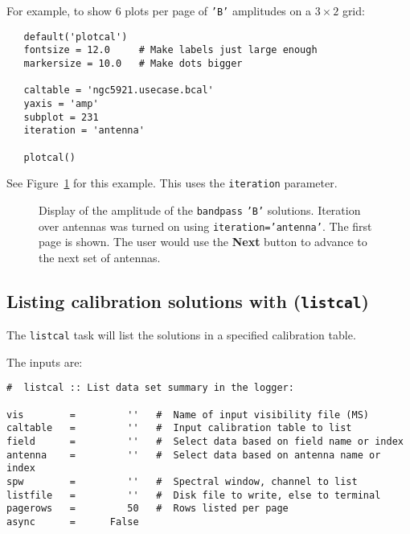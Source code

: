 
For example, to show 6 plots per page of {\tt 'B'} amplitudes on a 
$3 \times 2$ grid:
\small
\begin{verbatim}
   default('plotcal')
   fontsize = 12.0     # Make labels just large enough
   markersize = 10.0   # Make dots bigger

   caltable = 'ngc5921.usecase.bcal'
   yaxis = 'amp'
   subplot = 231
   iteration = 'antenna'

   plotcal()
\end{verbatim}
\normalsize
See Figure~\ref{fig:plotcal_B_5921_3x2} for this example.  This uses
the {\tt iteration} parameter.

\begin{figure}[h]
\begin{center}
\caption{\label{fig:plotcal_B_5921_3x2} Display of the amplitude
of the {\tt bandpass} {\tt 'B'} solutions.  Iteration over antennas
was turned on using {\tt iteration='antenna'}. The first page is shown.
The user would use the {\bf Next} button to advance to the next
set of antennas.} 
\hrulefill
\end{center}
\end{figure}


\subsection{Listing calibration solutions with ({\tt listcal})}
\label{section:cal.tables.listcal}

The {\tt listcal} task will list the solutions in a specified 
calibration table.

The inputs are:
\small
\begin{verbatim}
#  listcal :: List data set summary in the logger:

vis        =         ''   #  Name of input visibility file (MS)
caltable   =         ''   #  Input calibration table to list
field      =         ''   #  Select data based on field name or index
antenna    =         ''   #  Select data based on antenna name or index
spw        =         ''   #  Spectral window, channel to list
listfile   =         ''   #  Disk file to write, else to terminal
pagerows   =         50   #  Rows listed per page
async      =      False   
\end{verbatim}
\normalsize

